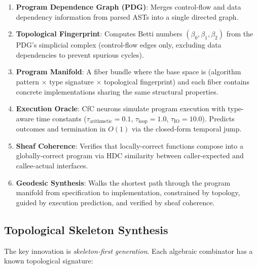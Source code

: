 \documentclass[11pt,a4paper]{article}
\begin{document}
\begin{enumerate}
    \item \textbf{Program Dependence Graph (PDG)}: Merges control-flow and data
    dependency information from parsed ASTs into a single directed graph.

    \item \textbf{Topological Fingerprint}: Computes Betti numbers
    $(\beta_0, \beta_1, \beta_2)$ from the PDG's simplicial complex (control-flow
    edges only, excluding data dependencies to prevent spurious cycles).

    \item \textbf{Program Manifold}: A fiber bundle where the base space is
    (algorithm pattern $\times$ type signature $\times$ topological fingerprint)
    and each fiber contains concrete implementations sharing the same structural
    properties.

    \item \textbf{Execution Oracle}: CfC neurons simulate program execution with
    type-aware time constants ($\tau_{\text{arithmetic}} = 0.1$,
    $\tau_{\text{loop}} = 1.0$, $\tau_{\text{IO}} = 10.0$). Predicts outcomes
    and termination in $O(1)$ via the closed-form temporal jump.

    \item \textbf{Sheaf Coherence}: Verifies that locally-correct functions
    compose into a globally-correct program via HDC similarity between
    caller-expected and callee-actual interfaces.

    \item \textbf{Geodesic Synthesis}: Walks the shortest path through the
    program manifold from specification to implementation, constrained by
    topology, guided by execution prediction, and verified by sheaf coherence.
\end{enumerate}

\subsection{Topological Skeleton Synthesis}

The key innovation is \emph{skeleton-first generation}. Each algebraic combinator
has a known topological signature:
\end{document}
